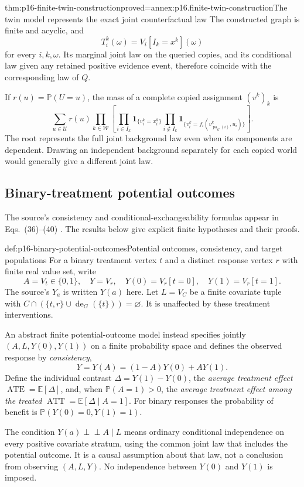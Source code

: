\begin{hbtheorem}{thm:p16-finite-twin-construction}{proved=annex:p16.finite-twin-construction}{The twin model represents the exact joint counterfactual law}
The constructed graph is finite and acyclic, and
\[
 T_i^k(\omega)=V_i[I_k=x^k](\omega)
\]
for every \(i,k,\omega\). Its marginal joint law on the queried
copies, and its conditional law given any retained positive evidence
event, therefore coincide with the corresponding law of \(Q\).

If \(r(u)=\mathbb P(U=u)\), the mass of a complete copied
assignment \((v^k)_k\) is
\[
 \sum_{u\in\mathcal U}r(u)
 \prod_{k\in\mathcal W}
 \left[
 \prod_{i\in I_k}\mathbf1_{\{v_i^k=x_i^k\}}
 \prod_{i\notin I_k}
 \mathbf1_{\{v_i^k=f_i(v^k_{\operatorname{pa}_G(i)},u_i)\}}
 \right].
\]
The root represents the full joint background law even when its
components are dependent. Drawing an independent background separately
for each copied world would generally give a different joint law.
\end{hbtheorem}

\subsection{Binary-treatment potential outcomes}

The source's consistency and conditional-exchangeability formulas appear
in Eqs.~(36)--(40) \cite[pp.~127--129]{Pearl2009CausalOverview}.
The results below give explicit finite hypotheses and their proofs.

\begin{hbdefinition}{def:p16-binary-potential-outcomes}{Potential outcomes, consistency, and target populations}
For a binary treatment vertex \(t\) and a distinct response vertex
\(r\) with finite real value set, write
\[
 A=V_t\in\{0,1\},\quad Y=V_r,\quad
 Y(0)=V_r[t=0],\quad Y(1)=V_r[t=1].
\]
The source's \(Y_a\) is written \(Y(a)\) here. Let \(L=V_C\)
be a finite covariate tuple with
\(C\cap(\{t,r\}\cup\operatorname{de}_G(\{t\}))=\varnothing\).
It is unaffected by these treatment interventions.

An abstract finite potential-outcome model instead specifies jointly
\((A,L,Y(0),Y(1))\) on a finite probability space and defines
the observed response by \emph{consistency},
\[
 Y=Y(A)=(1-A)Y(0)+AY(1).
\]
Define the individual contrast \(\Delta=Y(1)-Y(0)\), the
\emph{average treatment effect}
\(\operatorname{ATE}=\mathbb E[\Delta]\), and, when
\(\mathbb P(A=1)>0\), the \emph{average treatment effect among
the treated}
\(\operatorname{ATT}=\mathbb E[\Delta\mid A=1]\).
For binary responses the probability of benefit is
\(\mathbb P(Y(0)=0,Y(1)=1)\).

The condition \(Y(a)\mathrel{\perp\!\!\!\perp}A\mid L\)
means ordinary conditional independence on every positive covariate
stratum, using the common joint law that includes the potential outcome.
It is a causal assumption about that law, not a conclusion from observing
\((A,L,Y)\). No independence between \(Y(0)\) and \(Y(1)\)
is imposed.
\end{hbdefinition}

